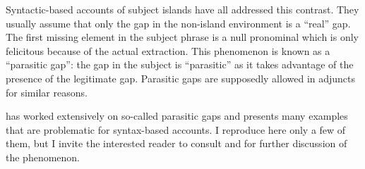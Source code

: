\begin{exe}
	\ex \citep[303]{Chaves.2013}
 \label{damage-repair-car}
 \begin{xlist}
		 \label{damage-repair-car-good}
	\end{xlist}
\end{exe}


Syntactic-based accounts of subject islands have all addressed this contrast. They usually assume that only the gap in the non-island environment is a ``real'' gap. The first missing element in the subject phrase is a null pronominal which is only felicitous because of the actual extraction. This phenomenon is known as a ``parasitic gap'': the gap in the subject is ``parasitic'' as it takes advantage of the presence of the legitimate gap. Parasitic gaps are supposedly allowed in adjuncts for similar reasons. 


\citeauthor{Chaves.2013} has worked extensively on so-called parasitic gaps and presents many examples that are problematic for syntax-based accounts. I reproduce here only a few of them, but I invite the interested reader to consult \citet{Chaves.2013} and \citet{Chaves.2020.UDC} for further discussion of the phenomenon. 

